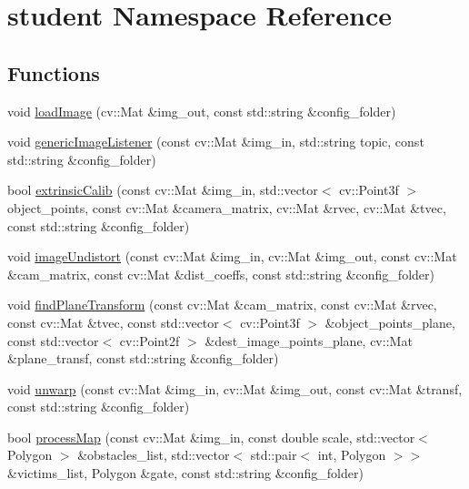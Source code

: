 \hypertarget{namespacestudent}{}\section{student Namespace Reference}
\label{namespacestudent}
\subsection*{Functions}
\begin{DoxyCompactItemize}
\item 
void \hyperlink{namespacestudent_a3117c968a47bf95f86bdb813a3b64e56}{load\+Image} (cv\+::\+Mat \&img\+\_\+out, const std\+::string \&config\+\_\+folder)
\item 
void \hyperlink{namespacestudent_a3b726e7af03a643c06dcde23057a82ea}{generic\+Image\+Listener} (const cv\+::\+Mat \&img\+\_\+in, std\+::string topic, const std\+::string \&config\+\_\+folder)
\item 
bool \hyperlink{namespacestudent_a6103f938ce28f8820c48c089d5f95098}{extrinsic\+Calib} (const cv\+::\+Mat \&img\+\_\+in, std\+::vector$<$ cv\+::\+Point3f $>$ object\+\_\+points, const cv\+::\+Mat \&camera\+\_\+matrix, cv\+::\+Mat \&rvec, cv\+::\+Mat \&tvec, const std\+::string \&config\+\_\+folder)
\item 
void \hyperlink{namespacestudent_aceb2a29362b8223a9d3601d9496e1c98}{image\+Undistort} (const cv\+::\+Mat \&img\+\_\+in, cv\+::\+Mat \&img\+\_\+out, const cv\+::\+Mat \&cam\+\_\+matrix, const cv\+::\+Mat \&dist\+\_\+coeffs, const std\+::string \&config\+\_\+folder)
\item 
void \hyperlink{namespacestudent_a528d33658d0d4d982a46f18b7abb4a70}{find\+Plane\+Transform} (const cv\+::\+Mat \&cam\+\_\+matrix, const cv\+::\+Mat \&rvec, const cv\+::\+Mat \&tvec, const std\+::vector$<$ cv\+::\+Point3f $>$ \&object\+\_\+points\+\_\+plane, const std\+::vector$<$ cv\+::\+Point2f $>$ \&dest\+\_\+image\+\_\+points\+\_\+plane, cv\+::\+Mat \&plane\+\_\+transf, const std\+::string \&config\+\_\+folder)
\item 
void \hyperlink{namespacestudent_a6b8caf348979f55e58a75193233c219d}{unwarp} (const cv\+::\+Mat \&img\+\_\+in, cv\+::\+Mat \&img\+\_\+out, const cv\+::\+Mat \&transf, const std\+::string \&config\+\_\+folder)
\item 
bool \hyperlink{namespacestudent_a684c71c41ce1327ab90152b661ee1e8a}{process\+Map} (const cv\+::\+Mat \&img\+\_\+in, const double scale, std\+::vector$<$ Polygon $>$ \&obstacles\+\_\+list, std\+::vector$<$ std\+::pair$<$ int, Polygon $>$$>$ \&victims\+\_\+list, Polygon \&gate, const std\+::string \&config\+\_\+folder)
$$
\end{DoxyCompactItemize}
